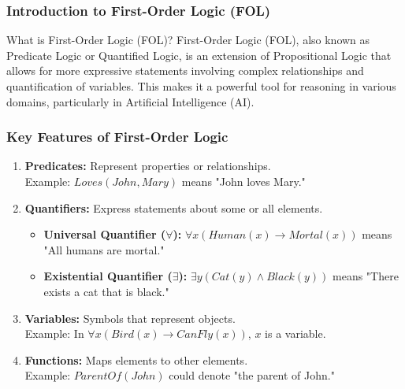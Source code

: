 \documentclass[aspectratio=169]{beamer}
\begin{document}
\frame{\titlepage}

\begin{frame}[fragile]
    \frametitle{Introduction to First-Order Logic (FOL)}
    \begin{block}{What is First-Order Logic (FOL)?}
        First-Order Logic (FOL), also known as Predicate Logic or Quantified Logic, is an extension of Propositional Logic that allows for more expressive statements involving complex relationships and quantification of variables. This makes it a powerful tool for reasoning in various domains, particularly in Artificial Intelligence (AI).
    \end{block}
\end{frame}

\begin{frame}[fragile]
    \frametitle{Key Features of First-Order Logic}
    \begin{enumerate}
        \item \textbf{Predicates:} Represent properties or relationships.\\
        Example: $Loves(John, Mary)$ means "John loves Mary."
        
        \item \textbf{Quantifiers:} Express statements about some or all elements.
        \begin{itemize}
            \item \textbf{Universal Quantifier ($\forall$):} $\forall x (Human(x) \rightarrow Mortal(x))$ means "All humans are mortal."
            \item \textbf{Existential Quantifier ($\exists$):} $\exists y (Cat(y) \land Black(y))$ means "There exists a cat that is black."
        \end{itemize}
        
        \item \textbf{Variables:} Symbols that represent objects.\\
        Example: In $\forall x (Bird(x) \rightarrow CanFly(x))$, $x$ is a variable.
        
        \item \textbf{Functions:} Maps elements to other elements.\\
        Example: $ParentOf(John)$ could denote "the parent of John."
    \end{enumerate}
\end{frame}
\end{document}

